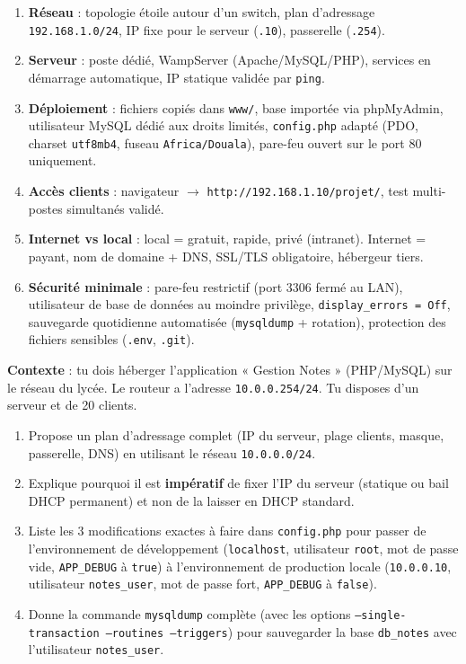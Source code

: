 \documentclass[11pt]{article}
\newcounter{popsec}
\newcounter{popsub}
\newcommand{\courssub}[1]{%
  \stepcounter{popsub}%
  \par\vspace{9pt}\noindent{\popxbold\fontsize{11.5}{13}\selectfont\color{popink}{\color{poporange}\thepopsec.\thepopsub}\hspace{6pt}#1}\par\nopagebreak\vspace{4pt}
}
\begin{document}
\begin{aretenir}
\begin{enumerate}
    \item \textbf{Réseau} : topologie étoile autour d'un switch, plan d'adressage \texttt{192.168.1.0/24}, IP fixe pour le serveur (\texttt{.10}), passerelle (\texttt{.254}).
    \item \textbf{Serveur} : poste dédié, WampServer (Apache/MySQL/PHP), services en démarrage automatique, IP statique validée par \texttt{ping}.
    \item \textbf{Déploiement} : fichiers copiés dans \texttt{www/}, base importée via phpMyAdmin, utilisateur MySQL dédié aux droits limités, \texttt{config.php} adapté (PDO, charset \texttt{utf8mb4}, fuseau \texttt{Africa/Douala}), pare-feu ouvert sur le port 80 uniquement.
    \item \textbf{Accès clients} : navigateur $\rightarrow$ \texttt{http://192.168.1.10/projet/}, test multi-postes simultanés validé.
    \item \textbf{Internet vs local} : local = gratuit, rapide, privé (intranet). Internet = payant, nom de domaine + DNS, SSL/TLS obligatoire, hébergeur tiers.
    \item \textbf{Sécurité minimale} : pare-feu restrictif (port 3306 fermé au LAN), utilisateur de base de données au moindre privilège, \texttt{display\_errors = Off}, sauvegarde quotidienne automatisée (\texttt{mysqldump} + rotation), protection des fichiers sensibles (\texttt{.env}, \texttt{.git}).
\end{enumerate}
\end{aretenir}

\courssub{Exercices d'application}

\begin{exercice}
\textbf{Contexte} : tu dois héberger l'application « Gestion Notes » (PHP/MySQL) sur le réseau du lycée. Le routeur a l'adresse \texttt{10.0.0.254/24}. Tu disposes d'un serveur et de 20 clients.
\begin{enumerate}
    \item Propose un plan d'adressage complet (IP du serveur, plage clients, masque, passerelle, DNS) en utilisant le réseau \texttt{10.0.0.0/24}.
    \item Explique pourquoi il est \textbf{impératif} de fixer l'IP du serveur (statique ou bail DHCP permanent) et non de la laisser en DHCP standard.
    \item Liste les 3 modifications exactes à faire dans \texttt{config.php} pour passer de l'environnement de développement (\texttt{localhost}, utilisateur \texttt{root}, mot de passe vide, \texttt{APP\_DEBUG} à \texttt{true}) à l'environnement de production locale (\texttt{10.0.0.10}, utilisateur \texttt{notes\_user}, mot de passe fort, \texttt{APP\_DEBUG} à \texttt{false}).
    \item Donne la commande \texttt{mysqldump} complète (avec les options \texttt{--single-transaction --routines --triggers}) pour sauvegarder la base \texttt{db\_notes} avec l'utilisateur \texttt{notes\_user}.
\end{enumerate}
\end{exercice}
\end{document}
